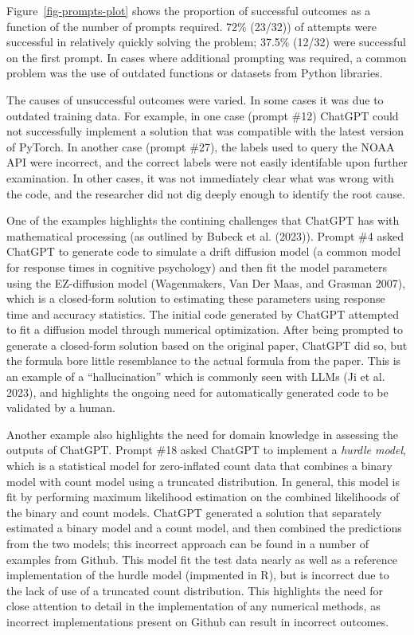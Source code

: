 \documentclass[
]{article}
\begin{document}
Figure~\ref{fig-prompts-plot} shows the proportion of successful
outcomes as a function of the number of prompts required. 72\% (23/32))
of attempts were successful in relatively quickly solving the problem;
37.5\% (12/32) were successful on the first prompt. In cases where
additional prompting was required, a common problem was the use of
outdated functions or datasets from Python libraries.

The causes of unsuccessful outcomes were varied. In some cases it was
due to outdated training data. For example, in one case (prompt \#12)
ChatGPT could not successfully implement a solution that was compatible
with the latest version of PyTorch. In another case (prompt \#27), the
labels used to query the NOAA API were incorrect, and the correct labels
were not easily identifable upon further examination. In other cases, it
was not immediately clear what was wrong with the code, and the
researcher did not dig deeply enough to identify the root cause.

One of the examples highlights the contining challenges that ChatGPT has
with mathematical processing (as outlined by Bubeck et al. (2023)).
Prompt \#4 asked ChatGPT to generate code to simulate a drift diffusion
model (a common model for response times in cognitive psychology) and
then fit the model parameters using the EZ-diffusion model (Wagenmakers,
Van Der Maas, and Grasman 2007), which is a closed-form solution to
estimating these parameters using response time and accuracy statistics.
The initial code generated by ChatGPT attempted to fit a diffusion model
through numerical optimization. After being prompted to generate a
closed-form solution based on the original paper, ChatGPT did so, but
the formula bore little resemblance to the actual formula from the
paper. This is an example of a ``hallucination'' which is commonly seen
with LLMs (Ji et al. 2023), and highlights the ongoing need for
automatically generated code to be validated by a human.

Another example also highlights the need for domain knowledge in
assessing the outputs of ChatGPT. Prompt \#18 asked ChatGPT to implement
a \emph{hurdle model}, which is a statistical model for zero-inflated
count data that combines a binary model with count model using a
truncated distribution. In general, this model is fit by performing
maximum likelihood estimation on the combined likelihoods of the binary
and count models. ChatGPT generated a solution that separately estimated
a binary model and a count model, and then combined the predictions from
the two models; this incorrect approach can be found in a number of
examples from Github. This model fit the test data nearly as well as a
reference implementation of the hurdle model (impmented in R), but is
incorrect due to the lack of use of a truncated count distribution. This
highlights the need for close attention to detail in the implementation
of any numerical methods, as incorrect implementations present on Github
can result in incorrect outcomes.
\end{document}
